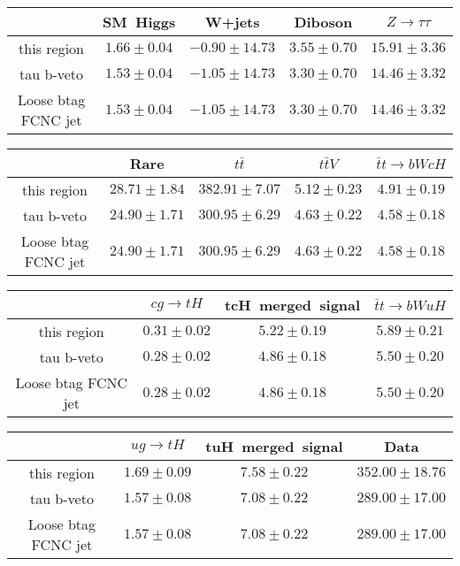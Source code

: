 \centering
\begin{tabular}{|c|c|c|c|c|} \hline
 & SM~Higgs & W+jets & Diboson & $Z\to \tau\tau$\\\hline
this region & $1.66\pm0.04$ & $-0.90\pm14.73$ & $3.55\pm0.70$ & $15.91\pm3.36$\\\hline
tau b-veto & $1.53\pm0.04$ & $-1.05\pm14.73$ & $3.30\pm0.70$ & $14.46\pm3.32$\\\hline
Loose btag FCNC jet & $1.53\pm0.04$ & $-1.05\pm14.73$ & $3.30\pm0.70$ & $14.46\pm3.32$\\\hline
\end{tabular}
\begin{tabular}{|c|c|c|c|c|} \hline
 & Rare & $t\bar{t}$ & $t\bar{t}V$ & $\bar{t}t\to bWcH$\\\hline
this region & $28.71\pm1.84$ & $382.91\pm7.07$ & $5.12\pm0.23$ & $4.91\pm0.19$\\\hline
tau b-veto & $24.90\pm1.71$ & $300.95\pm6.29$ & $4.63\pm0.22$ & $4.58\pm0.18$\\\hline
Loose btag FCNC jet & $24.90\pm1.71$ & $300.95\pm6.29$ & $4.63\pm0.22$ & $4.58\pm0.18$\\\hline
\end{tabular}
\begin{tabular}{|c|c|c|c|} \hline
 & $cg\to tH$ & tcH~merged~signal & $\bar{t}t\to bWuH$\\\hline
this region & $0.31\pm0.02$ & $5.22\pm0.19$ & $5.89\pm0.21$\\\hline
tau b-veto & $0.28\pm0.02$ & $4.86\pm0.18$ & $5.50\pm0.20$\\\hline
Loose btag FCNC jet & $0.28\pm0.02$ & $4.86\pm0.18$ & $5.50\pm0.20$\\\hline
\end{tabular}
\begin{tabular}{|c|c|c|c|} \hline
 & $ug\to tH$ & tuH~merged~signal & Data\\\hline
this region & $1.69\pm0.09$ & $7.58\pm0.22$ & $352.00\pm18.76$\\\hline
tau b-veto & $1.57\pm0.08$ & $7.08\pm0.22$ & $289.00\pm17.00$\\\hline
Loose btag FCNC jet & $1.57\pm0.08$ & $7.08\pm0.22$ & $289.00\pm17.00$\\\hline
\end{tabular}

